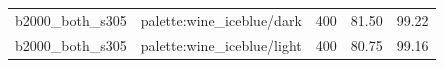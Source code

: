 \begin{longtable}{l>{\raggedright\arraybackslash}p{.42\linewidth}rrr}
b2000\_\allowbreak{}both\_\allowbreak{}s305 & %
palette:wine\_\allowbreak{}iceblue/dark & %
400 & %
81.50 & %
99.22 \\ %

b2000\_\allowbreak{}both\_\allowbreak{}s305 & %
palette:wine\_\allowbreak{}iceblue/light & %
400 & %
80.75 & %
99.16 \\ %


\end{longtable}
